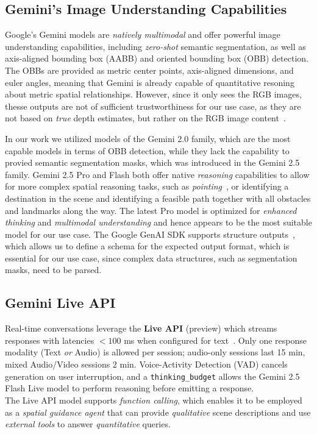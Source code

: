 \subsection{Gemini's Image Understanding Capabilities}
Google's Gemini models are \emph{natively multimodal} and offer powerful image understanding capabilities, including \emph{zero-shot} semantic segmentation, as well as axis-aligned bounding box (AABB) and oriented bounding box (OBB) detection. The OBBs are provided as metric center points, axis-aligned dimensions, and euler angles, meaning that Gemini is already capable of quantitative resoning about metric spatial relationships. However, since it only sees the RGB images, thesse outputs are not of sufficient trustworthiness for our use case, as they are not based on \emph{true} depth estimates, but rather on the RGB image content~\cite{googleImageUnderstanding2025}.

In our work we utilized models of the Gemini 2.0 family, which are the most capable models in terms of OBB detection, while they lack the capability to provied semantic segmentation masks, which was introduced in the Gemini 2.5 family. Gemini 2.5 Pro and Flash both offer native \emph{reasoning} capabilities to allow for more complex spatial reasoning tasks, such as \emph{pointing}~\cite{googleImageUnderstanding2025}, or identifying a destination in the scene and identifying a feasible path together with all obstacles and landmarks along the way. The latest Pro model is optimized for \emph{enhanced thinking} and  \emph{multimodal understanding} and hence appears to be the most suitable model for our use case. The Google GenAI SDK supports structure outputs~\cite{googleStructuredOutput2025}, which allows us to define a schema for the expected output format, which is essential for our use case, since complex data structures, such as segmentation masks, need to be parsed.

\subsection{Gemini Live API}
Real-time conversations leverage the \textbf{Live API} (preview) which streams
responses with latencies \( <100 \)  ms when configured for text~\cite{googleLiveApi2025}.  Only one response modality (Text \textit{or} Audio) is allowed per session; audio-only sessions last 15 min, mixed Audio/Video sessions 2 min.  Voice-Activity Detection (VAD) cancels generation on user interruption, and a \texttt{thinking\_budget} allows the Gemini 2.5 Flash Live model to perform reasoning before emitting a response.\\
The Live API model supports \emph{function calling}, which enables it to be employed as a \emph{spatial guidance agent} that can provide \emph{qualitative} scene descriptions and use \emph{external tools} to answer \emph{quantitative} queries.
